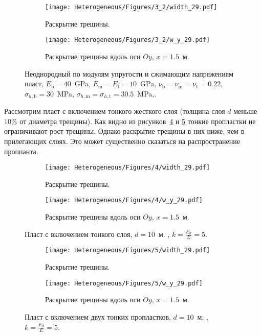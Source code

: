 \begin{figure}[htbp]
    \centering
    \begin{subfigure}[t]{0.4\textwidth}
        \centering
        \caption{Раскрытие трещины.}
        \label{fig:comparison-2-planar}
        \texttt{[image: Heterogeneous/Figures/3\_2/width\_29.pdf]}
    \end{subfigure}
    \hfill 
    \begin{subfigure}[t]{0.55\textwidth}
        \centering
        \caption{Раскрытие трещины вдоль оси $Oy$, $x=1.5$~м.}
        \label{fig:comparison-2-slice}
        \texttt{[image: Heterogeneous/Figures/3\_2/w\_y\_29.pdf]}
    \end{subfigure}
    \caption{Неоднородный по модулям упругости и сжимающим напряжениям пласт, $E_\text{b} = 40$~GPa, $E_\text{m} = E_\text{t} = 10$~GPa, $\nu_\text{b} = \nu_\text{m} = \nu_\text{t} = 0.22$, $\sigma_{h,\text{b}} = 30$~MPa, $\sigma_{h,\text{m}} = \sigma_{h,\text{t}} = 30.5$~MPa,.}
    \label{fig:comparison-2}
\end{figure}


Рассмотрим пласт с включением тонкого жесткого слоя (толщина слоя $d$ меньше $10\%$ от диаметра трещины). Как видно из рисунков~\ref{fig:thin-layer-1} и \ref{fig:thin-layer-2} тонкие пропластки не ограничивают рост трещины. Однако раскрытие трещины в них ниже, чем в прилегающих слоях. Это может существенно сказаться на распространение проппанта. 
\begin{figure}[htbp]
    \centering
    \begin{subfigure}[t]{0.4\textwidth}
        \centering
        \caption{Раскрытие трещины.}
        \texttt{[image: Heterogeneous/Figures/4/width\_29.pdf]}
    \end{subfigure}
    \hfill 
    \begin{subfigure}[t]{0.55\textwidth}
        \centering
        \caption{Раскрытие трещины вдоль оси $Oy$, $x=1.5$~м.}
        \texttt{[image: Heterogeneous/Figures/4/w\_y\_29.pdf]}
    \end{subfigure}
    \caption{Пласт с включением тонкого слоя, $d=10$~м. , $k=\frac{E_d}{E}=5$.}
    \label{fig:thin-layer-1}
\end{figure}

\begin{figure}[htbp]
    \centering
    \begin{subfigure}[t]{0.4\textwidth}
        \centering
        \caption{Раскрытие трещины.}
        \texttt{[image: Heterogeneous/Figures/5/width\_29.pdf]}
    \end{subfigure}
    \hfill 
    \begin{subfigure}[t]{0.55\textwidth}
        \centering
        \caption{Раскрытие трещины вдоль оси $Oy$, $x=1.5$~м.}
        \texttt{[image: Heterogeneous/Figures/5/w\_y\_29.pdf]}
    \end{subfigure}
    \caption{Пласт с включением двух тонких пропластков, $d=10$~м. , $k=\frac{E_d}{E}=5$.}
    \label{fig:thin-layer-2}
\end{figure}